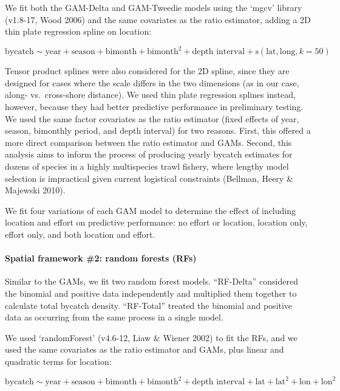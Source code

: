 \documentclass[]{article}
\let\oldparagraph\paragraph
\renewcommand{\paragraph}[1]{\oldparagraph{#1}\mbox{}}
\begin{document}
We fit both the GAM-Delta and GAM-Tweedie models using the `mgcv'
library (v1.8-17, Wood 2006) and the same covariates as the ratio
estimator, adding a 2D thin plate regression spline on location:

\[ \text{bycatch} \sim \text{year} + \text{season} + \text{bimonth} + \text{bimonth}^2 + \text{depth interval} + \text{s}(\text{lat}, \text{long}, k=50) \]

Tensor product splines were also considered for the 2D spline, since
they are designed for cases where the scale differs in the two
dimensions (as in our case, along- vs.~cross-shore distance). We used
thin plate regression splines instead, however, because they had better
predictive performance in preliminary testing. We used the same factor
covariates as the ratio estimator (fixed effects of year, season,
bimonthly period, and depth interval) for two reasons. First, this
offered a more direct comparison between the ratio estimator and GAMs.
Second, this analysis aims to inform the process of producing yearly
bycatch estimates for dozens of species in a highly multispecies trawl
fishery, where lengthy model selection is impractical given current
logistical constraints (Bellman, Heery \& Majewski 2010).

We fit four variations of each GAM model to determine the effect of
including location and effort on predictive performance: no effort or
location, location only, effort only, and both location and effort.

\hypertarget{spatial-framework-2-random-forests-rfs}{%
\paragraph{Spatial framework \#2: random forests
(RFs)}\label{spatial-framework-2-random-forests-rfs}}

Similar to the GAMs, we fit two random forest models. ``RF-Delta''
considered the binomial and positive data independently and multiplied
them together to calculate total bycatch density. ``RF-Total'' treated
the binomial and positive data as occurring from the same process in a
single model.

We used `randomForest' (v4.6-12, Liaw \& Wiener 2002) to fit the RFs,
and we used the same covariates as the ratio estimator and GAMs, plus
linear and quadratic terms for location:

\[ \text{bycatch} \sim \text{year} + \text{season} + \text{bimonth} + \text{bimonth}^2 + \text{depth interval} + \text{lat} + \text{lat}^2 + \text{lon} + \text{lon}^2\]
\end{document}
